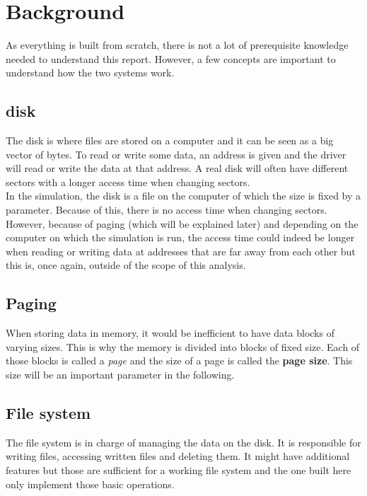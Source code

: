 \documentclass[10pt,a4paper]{ULBreport}
\begin{document}
\chapter{Background}

As everything is built from scratch, there is not a lot of prerequisite knowledge needed to understand this report. However, a few concepts are important to understand how the two systems work.

\section{disk}
\label{sec:disk}

The disk is where files are stored on a computer and it can be seen as a big vector of bytes. To read or write some data, an address is given and the driver will read or write the data at that address. A real disk will often have different sectors with a longer access time when changing sectors. \\

In the simulation, the disk is a file on the computer of which the size is fixed by a parameter. Because of this, there is no access time when changing sectors. However, because of paging (which will be explained later) and depending on the computer on which the simulation is run, the access time could indeed be longer when reading or writing data at addresses that are far away from each other but this is, once again, outside of the scope of this analysis. \\

\section{Paging}
\label{sec:paging}

When storing data in memory, it would be inefficient to have data blocks of varying sizes. This is why the memory is divided into blocks of fixed size. Each of those blocks is called a \textit{page} and the size of a page is called the \textbf{page size}. This size will be an important parameter in the following.

\section{File system}
\label{sec:filesystem}

The file system is in charge of managing the data on the disk. It is responsible for writing files, accessing written files and deleting them. It might have additional features but those are sufficient for a working file system and the one built here only implement those basic operations.
\end{document}
